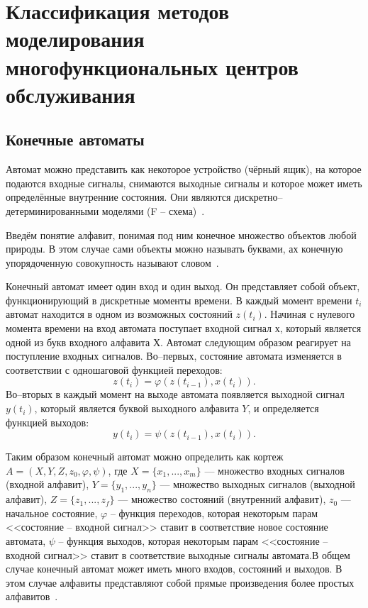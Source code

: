 \chapter[Классификация методов моделирования\\многофункциональных центров обслуживания]{Классификация методов моделирования\\многофункциональных центров\\обслуживания}
\section{Конечные автоматы}

Автомат можно представить как некоторое устройство (чёрный ящик), на которое подаются входные сигналы, снимаются выходные сигналы и которое может иметь определённые внутренние состояния. Они являются дискретно--детерминированными моделями (F – схема)~\cite{ak_det}.

Введём понятие алфавит, понимая под ним конечное множество объектов любой природы. В этом случае сами объекты можно называть буквами, ах конечную упорядоченную совокупность называют словом~\cite{ak_det}.

Конечный автомат имеет один вход и один выход. Он представляет собой объект, функционирующий в дискретные моменты времени. В каждый момент времени $t_i$ автомат находится в одном из возможных состояний $z(t_i)$. Начиная с нулевого момента времени на вход автомата поступает входной сигнал $х$, который является одной из букв входного алфавита $Х$.
Автомат следующим образом реагирует на поступление входных сигналов. Во--первых, состояние автомата изменяется в соответствии с одношаговой функцией переходов:
\begin{equation}
	\label{eq:ka_tr}
	z(t_i) = \varphi(z(t_{i-1}), x(t_i)).
\end{equation}
Во--вторых в каждый момент на выходе автомата появляется выходной сигнал $y(t_i)$, который является буквой выходного алфавита $Y$, и определяется функцией выходов:
\begin{equation}
	\label{eq:ka1_q}
	y(t_i) = \psi(z(t_{i-1}), x(t_i)).
\end{equation}

Таким образом конечный автомат можно определить как кортеж $A = (X, Y, Z, z_0, \varphi, \psi)$, где $X=\{x_1, ..., x_m\}$ --- множество входных сигналов (входной алфавит),  $Y=\{y_1, ..., y_n\}$ --- множество выходных сигналов (выходной алфавит), $Z=\{z_1, ..., z_f\}$ --- множество состояний (внутренний алфавит), $z_0$ --- начальное состояние, $\varphi$ -- функция переходов, которая некоторым парам <<состояние -- входной сигнал>> ставит в соответствие  новое состояние автомата, $\psi$ -- функция выходов, которая некоторым парам <<состояние -- входной сигнал>> ставит в соответствие выходные сигналы автомата.В общем случае конечный автомат может иметь много входов, состояний и выходов. В этом случае алфавиты представляют собой прямые произведения более простых алфавитов~\cite{ak_det}.

